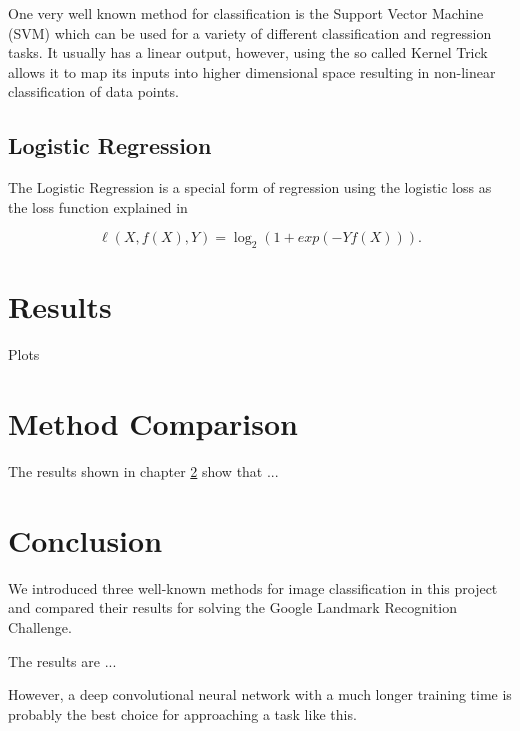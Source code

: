 One very well known method for classification is the Support Vector Machine (SVM) which can be used for a variety of different classification and regression tasks. It usually has a linear output, however, using the so called Kernel Trick allows it to map its inputs into higher dimensional space resulting in non-linear classification of data points.

\section{Logistic Regression}

The Logistic Regression is a special form of regression using the logistic loss as the loss function explained in \cite{logistic-loss}

\[\ell(X, f(X), Y) = \log_2(1 + exp(-Y f(X))).\]

\chapter{Results}\label{results}

Plots

\chapter{Method Comparison}

The results shown in chapter \ref{results} show that ...

\chapter{Conclusion}

We introduced three well-known methods for image classification in this project and compared their results for solving the Google Landmark Recognition Challenge.

The results are ...

However, a deep convolutional neural network with a much longer training time is probably the best choice for approaching a task like this.